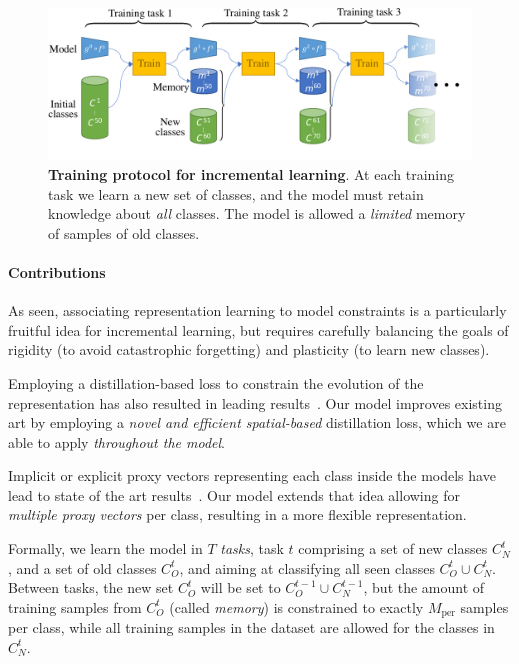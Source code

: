 \begin{figure}[tb]
    \begin{center}
        \includegraphics[width=0.8\linewidth]{images/podnet/protocol}
    \end{center}
    \caption{\textbf{Training protocol for incremental learning}. At each training task we learn a
        new set of classes, and the model must retain knowledge about \textit{all} classes. The
        model is allowed a \textit{limited} memory of samples of old classes.}
    \label{fig:protocol}
\end{figure}

\paragraph{Contributions} As seen, associating representation learning to model constraints is a
particularly fruitful idea for incremental learning, but requires carefully balancing the goals of
rigidity (to avoid catastrophic forgetting) and plasticity (to learn new classes).

Employing a distillation-based loss to constrain the evolution of the representation has also
resulted in leading
results~\citep{hou2019ucir,wu2019bias_correction,peng2019m2kd,dhar2019learning_without_memorizing_gradcam}.
Our model improves existing art by employing a \textit{novel and efficient spatial-based}
distillation loss, which we are able to apply \textit{throughout the model}.

Implicit or explicit proxy vectors representing each class inside the models have lead to state of
the art results~\citep{rebuffi2017icarl,hou2019ucir}. Our model extends that idea allowing for
\textit{multiple proxy vectors} per class, resulting in a more flexible representation.


Formally, we learn the model in $T$ \textit{tasks}, task $t$ comprising a set of new classes
$C^t_N$, and a set of old classes $C^t_O$, and aiming at classifying all seen classes $C^t_O \cup
    C^t_N$. Between tasks, the new set $C^t_O$ will be set to $C^{t-1}_O \cup C^{t-1}_N$, but the amount
of training samples from $C^t_O$ (called \textit{memory}) is constrained to exactly $M_\mathrm{per}$
samples per class, while all training samples in the dataset are allowed for the classes in $C^t_N$.

